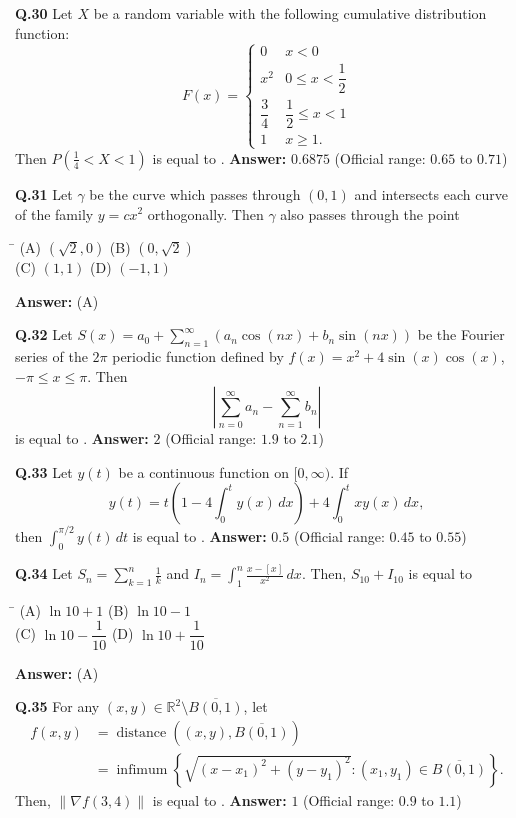 \documentclass[11pt,a4paper]{article}
\newcommand{\optsfourA}[4]{%
  \begin{tabbing}
    \hspace{0.48\linewidth}\=\kill
    (A) #1 \> (B) #2 \\[2pt]
    (C) #3 \> (D) #4
  \end{tabbing}%
}
\newcommand{\ans}[1]{\textbf{Answer:} #1\par\medskip}
\begin{document}
\textbf{Q.30} Let $X$ be a random variable with the following cumulative distribution function:
\[
  F(x) = \begin{cases}
    0 & x < 0 \\
    x^2 & 0 \le x < \dfrac{1}{2} \\[6pt]
    \dfrac{3}{4} & \dfrac{1}{2} \le x < 1 \\[4pt]
    1 & x \ge 1.
  \end{cases}
\]
Then $P\!\left(\frac{1}{4} < X < 1\right)$ is equal to \underline{\hspace{2cm}}.
\ans{$0.6875$ (Official range: $0.65$ to $0.71$)}

\textbf{Q.31} Let $\gamma$ be the curve which passes through $(0, 1)$ and intersects each curve of the family $y = cx^2$ orthogonally. Then $\gamma$ also passes through the point
\optsfourA{$(\sqrt{2}, 0)$}{$(0, \sqrt{2})$}{$(1, 1)$}{$(-1, 1)$}
\ans{(A)}

\textbf{Q.32} Let $S(x) = a_0 + \sum_{n=1}^{\infty} (a_n \cos(nx) + b_n \sin(nx))$ be the Fourier series of the $2\pi$ periodic function defined by $f(x) = x^2 + 4\sin(x)\cos(x)$, $-\pi \le x \le \pi$. Then
\[
  \left|\sum_{n=0}^{\infty} a_n - \sum_{n=1}^{\infty} b_n\right|
\]
is equal to \underline{\hspace{2cm}}.
\ans{$2$ (Official range: $1.9$ to $2.1$)}

\textbf{Q.33} Let $y(t)$ be a continuous function on $[0, \infty)$. If
\[
  y(t) = t\!\left(1 - 4\int_0^t y(x)\,dx\right) + 4\int_0^t x y(x)\,dx,
\]
then $\int_0^{\pi/2} y(t)\,dt$ is equal to \underline{\hspace{2cm}}.
\ans{$0.5$ (Official range: $0.45$ to $0.55$)}

\textbf{Q.34} Let $S_n = \sum_{k=1}^{n} \frac{1}{k}$ and $I_n = \int_1^n \frac{x - [x]}{x^2}\,dx$. Then, $S_{10} + I_{10}$ is equal to
\optsfourA{$\ln 10 + 1$}{$\ln 10 - 1$}{$\ln 10 - \dfrac{1}{10}$}{$\ln 10 + \dfrac{1}{10}$}
\ans{(A)}

\textbf{Q.35} For any $(x, y) \in \mathbb{R}^2 \setminus \overline{B(0, 1)}$, let
\begin{align*}
  f(x, y) &= \operatorname{distance}\!\left((x, y), \overline{B(0, 1)}\right) \\
          &= \operatorname{infimum}\left\{\sqrt{(x - x_1)^2 + (y - y_1)^2} : (x_1, y_1) \in \overline{B(0, 1)}\right\}.
\end{align*}
Then, $\|\nabla f(3, 4)\|$ is equal to \underline{\hspace{2cm}}.
\ans{$1$ (Official range: $0.9$ to $1.1$)}
\end{document}
